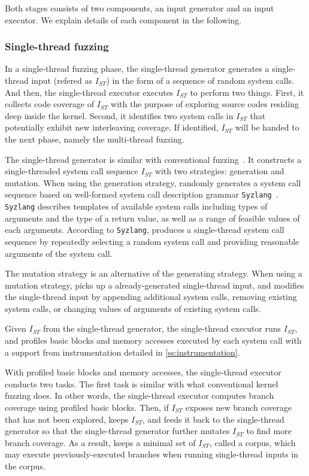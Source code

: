 Both stages consists of two components, an input generator and an
input executor. We explain details of each component in the following.


\subsubsection{Single-thread fuzzing}
%
In a single-thread fuzzing phase, the single-thread generator
generates a single-thread input (refered as $I_{ST}$) in the form of a
sequence of random system calls.
%
And then, the single-thread executor executes $I_{ST}$ to perform two
things.
%
First, it collects code coverage of $I_{ST}$ with the purpose of
exploring source codes residing deep inside the kernel.
%
Second, it identifies two system calls in $I_{ST}$ that potentially
exhibit new interleaving coverage.  If identified, $I_{ST}$ will be
handed to the next phase, namely the multi-thread fuzzing.


%
The single-thread generator is similar with conventional
fuzzing~\cite{syzkaller}.
%
It constructs a single-threaded system call sequence $I_{ST}$ with two
strategies: generation and mutation.
%
When using the generation strategy, \sys randomly generates a system
call sequence based on well-formed system call description grammar
\texttt{Syzlang}~\cite{syzlang}.
%
\texttt{Syzlang} describes templates of available system calls
including types of arguments and the type of a return value, as well
as a range of feasible values of each arguments.
%
According to \texttt{Syzlang}, \sys produces a single-thread system
call sequence by repeatedly selecting a random system call and
providing reasonable arguments of the system call.

The mutation strategy is an alternative of the generating strategy.
When using a mutation strategy, \sys picks up a already-generated
single-thread input, and modifies the single-thread input by appending
additional system calls, removing existing system calls, or changing
values of arguments of existing system calls.


%
Given $I_{ST}$ from the single-thread generator, the single-thread
executor runs $I_{ST}$, and profiles basic blocks and memory accesses
executed by each system call with a support from instrumentation
detailed in \autoref{ss:instrumentation}.

With profiled basic blocks and memory accesses, the single-thread
executor conducts two tasks.
%
The first task is similar with what conventional kernel fuzzing
does.
%
In other words, the single-thread executor computes branch coverage
using profiled basic blocks.
%
Then, if $I_{ST}$ exposes new branch coverage that has not been
explored, \sys keeps $I_{ST}$, and feeds it back to the single-thread
generator so that the single-thread generator further mutates $I_{ST}$
to find more branch coverage.
%
As a result, \sys keeps a minimal set of $I_{ST}$, called a corpus,
which may execute previously-executed branches when running
single-thread inputs in the corpus.


